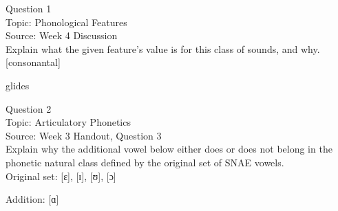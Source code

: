 \documentclass[12pt]{article}
\begin{document}
\begin{center}
\textbf{{\color{blue}{\HUGE START OF EXAM\\}}}

\textbf{{\color{blue}{\HUGE Student ID: 17335\\}}}

\textbf{{\color{blue}{\HUGE 10:40\\}}}

\end{center}
\newpage

{\large Question 1}\\

Topic: Phonological Features\\
Source: Week 4 Discussion\\

Explain what the given feature’s value is for this class of sounds, and why.\\

{[consonantal]}

glides


\newpage

{\large Question 2}\\

Topic: Articulatory Phonetics\\
Source: Week 3 Handout, Question 3\\

Explain why the additional vowel below either does or does not belong in the phonetic natural class defined by the original set of SNAE vowels.\\

Original set: {[ɛ]}, {[ɪ]}, {[ʊ]}, {[ɔ]}

Addition: {[ɑ]}


\newpage

\begin{center}
\textbf{{\color{red}{\HUGE END OF EXAM}}}\\

\end{center}
\newpage

\begin{center}
\textbf{{\color{blue}{\HUGE START OF EXAM\\}}}

\textbf{{\color{blue}{\HUGE Student ID: empty\\}}}

\textbf{{\color{blue}{\HUGE 10:50\\}}}

\end{center}
\newpage
\end{document}
